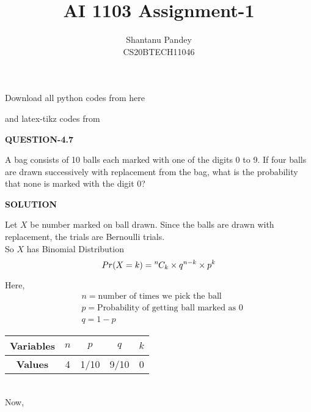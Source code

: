 \documentclass[a4paper]{article}
\title{AI 1103 Assignment-1}
\author{Shantanu Pandey\\ CS20BTECH11046}
\date{}
\newcommand*{\permcomb}[4][0mu]{{{}^{#3}\mkern#1#2_{#4}}}
\newcommand*{\comb}[1][-1mu]{\permcomb[#1]{C}}
\begin{document}
\maketitle
\noindent
Download all python codes from here

\begin{multicols*}{2}
\noindent
{}
    
\vspace{0.3cm}
and latex-tikz codes from  

\vspace{0.3cm}  
    
   
\vspace{0.5cm}
\textbf{QUESTION-4.7}
\vspace{0.5cm} 

A bag consists of 10 balls each marked with
one of the digits 0 to 9. If four balls are drawn
successively with replacement from the bag,
what is the probability that none is marked
with the digit 0?

\vspace{0.5cm}
\textbf{SOLUTION}
\vspace{0.5cm} 

\vspace{0.3cm}

Let $X$ be number marked on ball drawn.
Since the balls are drawn with replacement, the trials are Bernoulli trials.
\\
So $X$ has Binomial Distribution 
\begin{equation}
    Pr(X=k)=\comb{n}{k} \times q^{n-k} \times p^{k} 
\end{equation} 

Here,\\
\begin{align*}
& n = \text {number of times we pick the ball}  \\
& p= \text{Probability of getting ball marked as 0} \\
& q=1-p
\end{align*}

\begin{tabular}{|c|c|c|c|c|}
\hline
\textbf{Variables} & $n$ & $p$    & $q$    & $k$          \\ \hline
\textbf{Values}    & 4 & 1/10 & 9/10 & 0 \\ \hline
\end{tabular}
\\
Now,


\end{multicols*}
\end{document}
